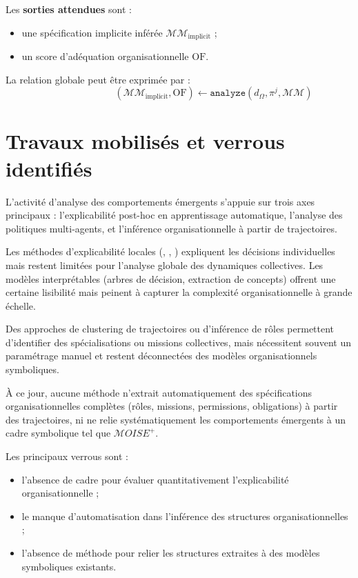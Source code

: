 Les \textbf{sorties attendues} sont :
\begin{itemize}
  \item une spécification implicite inférée $\mathcal{MM}_{\text{implicit}}$ ;
  \item un score d'adéquation organisationnelle $\text{OF}$.
\end{itemize}

\noindent La relation globale peut être exprimée par :
\[
  \hspace{3cm}(\mathcal{MM}_{\text{implicit}}, \text{OF}) \gets \texttt{analyze}(d_\Omega, \pi^j, \mathcal{MM})
\]


\section{Travaux mobilisés et verrous identifiés}

L'activité d'analyse des comportements émergents s'appuie sur trois axes principaux : l'explicabilité post-hoc en apprentissage automatique, l'analyse des politiques multi-agents, et l'inférence organisationnelle à partir de trajectoires.

Les méthodes d'explicabilité locales (, , ) expliquent les décisions individuelles mais restent limitées pour l'analyse globale des dynamiques collectives. Les modèles interprétables (arbres de décision, extraction de concepts) offrent une certaine lisibilité mais peinent à capturer la complexité organisationnelle à grande échelle.

Des approches de clustering de trajectoires ou d'inférence de rôles permettent d'identifier des spécialisations ou missions collectives, mais nécessitent souvent un paramétrage manuel et restent déconnectées des modèles organisationnels symboliques.

À ce jour, aucune méthode n'extrait automatiquement des spécifications organisationnelles complètes (rôles, missions, permissions, obligations) à partir des trajectoires, ni ne relie systématiquement les comportements émergents à un cadre symbolique tel que $\mathcal{M}OISE^+$.

Les principaux verrous sont :
\begin{itemize}
  \item l'absence de cadre pour évaluer quantitativement l'explicabilité organisationnelle ;
  \item le manque d'automatisation dans l'inférence des structures organisationnelles ;
  \item l'absence de méthode pour relier les structures extraites à des modèles symboliques existants.
\end{itemize}

